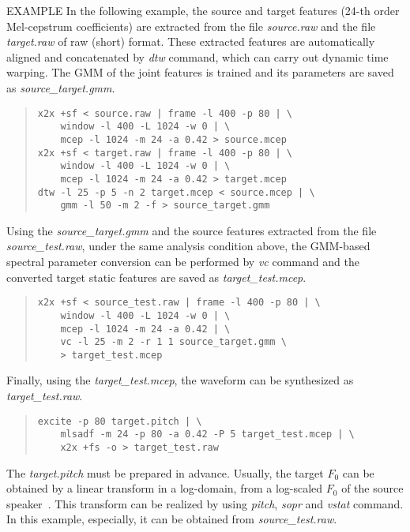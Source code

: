 \begin{qsection}{EXAMPLE}
In the following example, the source and target features (24-th order Mel-cepstrum
coefficients) are extracted from the file {\em source.raw} and the file {\em
target.raw} of raw (short) format.  These extracted features are automatically
aligned and concatenated by {\em dtw} command, which can carry out dynamic time
warping.  The GMM of the joint features is trained and its parameters are saved
as {\em source\_target.gmm}.
\begin{quote}
\verb!x2x +sf < source.raw | frame -l 400 -p 80 | \! \\
\verb!    window -l 400 -L 1024 -w 0 | \! \\
\verb!    mcep -l 1024 -m 24 -a 0.42 > source.mcep ! \\
\verb!x2x +sf < target.raw | frame -l 400 -p 80 | \! \\
\verb!    window -l 400 -L 1024 -w 0 | \! \\
\verb!    mcep -l 1024 -m 24 -a 0.42 > target.mcep ! \\
\verb!dtw -l 25 -p 5 -n 2 target.mcep < source.mcep | \! \\
\verb!    gmm -l 50 -m 2 -f > source_target.gmm!
\end{quote}
Using the {\em source\_target.gmm} and the source features extracted from the file
{\em source\_test.raw}, under the same analysis condition above, the GMM-based
spectral parameter conversion can be performed by {\em vc} command and the converted
target static features are saved as {\em target\_test.mcep}.
\begin{quote}
\verb!x2x +sf < source_test.raw | frame -l 400 -p 80 | \! \\
\verb!    window -l 400 -L 1024 -w 0 | \! \\
\verb!    mcep -l 1024 -m 24 -a 0.42 | \! \\
\verb!    vc -l 25 -m 2 -r 1 1 source_target.gmm \! \\
\verb!    > target_test.mcep!
\end{quote}
Finally, using the {\em target\_test.mcep}, the waveform can be synthesized as {\em
 target\_test.raw}.
\begin{quote}
\verb!excite -p 80 target.pitch | \! \\
\verb!    mlsadf -m 24 -p 80 -a 0.42 -P 5 target_test.mcep | \! \\
\verb!    x2x +fs -o > target_test.raw!
\end{quote}
The {\em target.pitch} must be prepared in advance.  Usually, the target $F_0$ can be
obtained by a linear transform in a log-domain, from a log-scaled $F_0$ of the source
speaker~\cite{ref:vc-IEEETASLP}.  This transform can be realized by using {\em
pitch}, {\em sopr} and {\em vstat} command.  In this example, especially, it can be
obtained from {\em source\_test.raw}.
\end{qsection}

